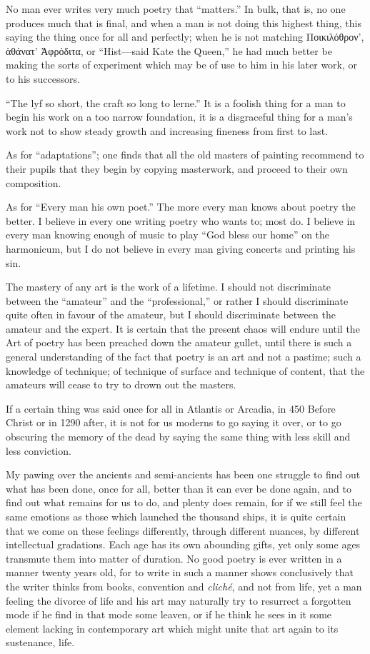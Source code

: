 No man ever writes very much poetry that ``matters.'' In bulk, that is,
no one produces much that is final, and when a man is not doing this
highest thing, this saying the thing once for all and perfectly; when he
is not matching Ποικιλόθρον', ὰθάνατ' Ἀφρόδιτα, or ``Hist---said Kate
the Queen,'' he had much better be making the sorts of experiment which
may be of use to him in his later work, or to his successors.

``The lyf so short, the craft so long to lerne.'' It is a foolish thing
for a man to begin his work on a too narrow foundation, it is a
disgraceful thing for a man's work not to show steady growth and
increasing fineness from first to last.

As for ``adaptations''; one finds that all the old masters of painting
recommend to their pupils that they begin by copying masterwork, and
proceed to their own composition.

As for ``Every man his own poet.'' The more every man knows about poetry
the better. I believe in every one writing poetry who wants to; most do.
I believe in every man knowing enough of music to play ``God bless our
home'' on the harmonicum, but I do not believe in every man giving
concerts and printing his sin.

The mastery of any art is the work of a lifetime. I should not
discriminate between the ``amateur'' and the ``professional,'' or rather
I should discriminate quite often in favour of the amateur, but I should
discriminate between the amateur and the expert. It is certain that the
present chaos will endure until the Art of poetry has been preached down
the amateur gullet, until there is such a general understanding of the
fact that poetry is an art and not a pastime; such a knowledge of
technique; of technique of surface and technique of content, that the
amateurs will cease to try to drown out the masters.

If a certain thing was said once for all in Atlantis or Arcadia, in 450
Before Christ or in 1290 after, it is not for us moderns to go saying it
over, or to go obscuring the memory of the dead by saying the same thing
with less skill and less conviction.

My pawing over the ancients and semi-ancients has been one struggle to
find out what has been done, once for all, better than it can ever be
done again, and to find out what remains for us to do, and plenty does
remain, for if we still feel the same emotions as those which launched
the thousand ships, it is quite certain that we come on these feelings
differently, through different nuances, by different intellectual
gradations. Each age has its own abounding gifts, yet only some ages
transmute them into matter of duration. No good poetry is ever written
in a manner twenty years old, for to write in such a manner shows
conclusively that the writer thinks from books, convention and
\emph{cliché}, and not from life, yet a man feeling the divorce of life
and his art may naturally try to resurrect a forgotten mode if he find
in that mode some leaven, or if he think he sees in it some element
lacking in contemporary art which might unite that art again to its
sustenance, life.

